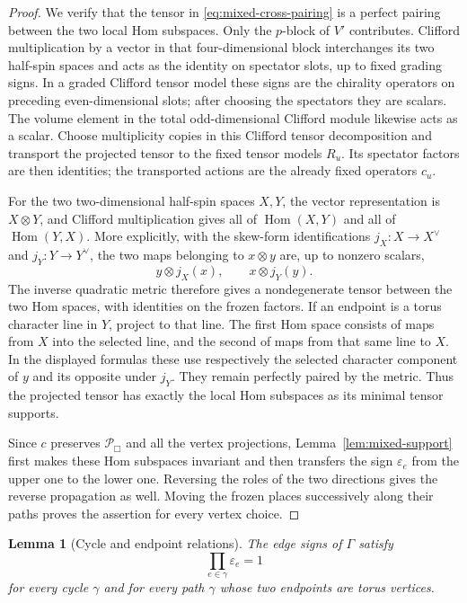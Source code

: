 \documentclass[11pt]{article}
\numberwithin{equation}{section}
\newtheorem{lemma}[theorem]{Lemma}
\theoremstyle{definition}
\theoremstyle{remark}
\begin{document}
\begin{proof}
We verify that the tensor in \eqref{eq:mixed-cross-pairing} is a
perfect pairing between the two local Hom subspaces.  Only the
$p$-block of $V'$ contributes.  Clifford multiplication by a vector
in that four-dimensional block interchanges its two half-spin
spaces and acts as the identity on spectator slots, up to fixed
grading signs.  In a graded Clifford tensor model these signs are
the chirality operators on preceding even-dimensional slots; after
choosing the spectators they are scalars.  The volume element in
the total odd-dimensional Clifford module likewise acts as a
scalar.  Choose multiplicity copies in this Clifford tensor
decomposition and transport the projected tensor to the fixed
tensor models $R_u$.  Its spectator factors are then identities;
the transported actions are the already fixed operators $c_u$.

For the two two-dimensional half-spin spaces $X,Y$, the vector
representation is $X\otimes Y$, and Clifford multiplication gives
all of $\operatorname{Hom}(X,Y)$ and all of $\operatorname{Hom}(Y,X)$.  More explicitly, with
the skew-form identifications $j_X:X\to X^\vee$ and
$j_Y:Y\to Y^\vee$, the two maps belonging to $x\otimes y$ are,
up to nonzero scalars,
\[
 y\otimes j_X(x),\qquad x\otimes j_Y(y).
\]
The inverse quadratic metric therefore gives a nondegenerate tensor
between the two Hom spaces, with identities on the frozen factors.
If an endpoint is a torus character line in $Y$, project to that
line.  The first Hom space consists of maps from $X$ into the selected
line, and the second of maps from that same line to $X$.  In the
displayed formulas these use respectively the selected character
component of $y$ and its opposite under $j_Y$.  They remain perfectly
paired by the metric.  Thus the projected tensor has
exactly the local Hom subspaces as its minimal tensor supports.

Since $c$ preserves $\mathcal P_{\Box}$ and all the vertex
projections, Lemma~\ref{lem:mixed-support} first makes these Hom
subspaces invariant and then transfers the sign $\varepsilon_e$
from the upper one to the lower one.  Reversing the roles of the
two directions gives the reverse propagation as well.  Moving the
frozen places successively along their paths proves the assertion
for every vertex choice.
\end{proof}

\begin{lemma}[Cycle and endpoint relations]\label{lem:mixed-cycle}
The edge signs of $\Gamma$ satisfy
\begin{equation}\label{eq:mixed-cycle-signs}
 \prod_{e\in\gamma}\varepsilon_e=1
\end{equation}
for every cycle $\gamma$ and for every path $\gamma$ whose two
endpoints are torus vertices.
\end{lemma}
\end{document}
